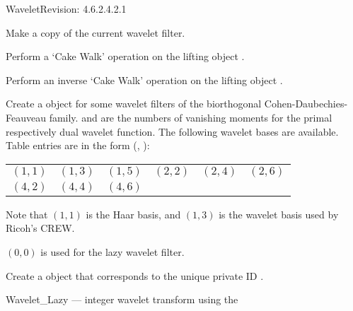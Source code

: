 \begin{manpage}{\libtitle}{Wavelet}{$ $Revision: 4.6.2.4.2.1 $ $}

\subtitle{Virtual \\ Operations}

    Make a copy of the current wavelet filter.

    Perform a `Cake Walk' operation on the lifting object .

    Perform an inverse `Cake Walk' operation on the lifting object
    .


\subtitle{Static \\ Operations}

    Create a  object for some wavelet filters of the biorthogonal
    Cohen-Daubechies-Feauveau family.  and  are the numbers
    of vanishing moments for the primal respectively dual wavelet function. The
    following wavelet bases are available. Table entries are in the form
    (, ):
    \begin{center}\begin{tabular}{llllll}
    $(1, 1)$ & $(1, 3)$ & $(1, 5)$ & $(2, 2)$ & $(2, 4)$ & $(2, 6)$ \\
    $(4, 2)$ & $(4, 4)$ & $(4, 6)$ \\
    \end{tabular}\end{center}
    Note that $(1, 1)$ is the Haar basis, and $(1, 3)$ is the wavelet basis
    used by Ricoh's CREW.

    $(0, 0)$ is used for the lazy wavelet filter.

    Create a  object that corresponds to the unique private ID
    .


\separator

\subtitle{Name}
    Wavelet\_Lazy ---  integer wavelet transform using the



\end{manpage}
